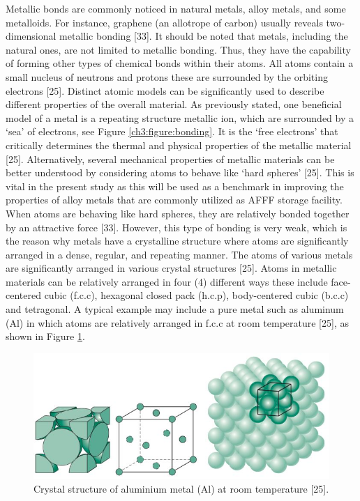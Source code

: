 \documentclass[12pt]{report}
\begin{document}
Metallic bonds are commonly noticed in natural metals, alloy metals, and some metalloids. For instance, graphene (an allotrope of carbon) usually reveals two-dimensional metallic bonding [33]. It should be noted that metals, including the natural ones, are not limited to metallic bonding. Thus, they have the capability of forming other types of chemical bonds within their atoms.
All atoms contain a small nucleus of neutrons and protons these are surrounded by the orbiting electrons [25]. Distinct atomic models can be significantly used to describe different properties of the overall material. As previously stated, one beneficial model of a metal is a repeating structure metallic ion, which are surrounded by a ‘sea’ of electrons, see Figure \ref{ch3:figure:bonding}. It is the ‘free electrons’ that critically determines the thermal and physical properties of the metallic material [25]. Alternatively, several mechanical properties of metallic materials can be better understood by considering atoms to behave like ‘hard spheres’ [25]. This is vital in the present study as this will be used as a benchmark in improving the properties of alloy metals that are commonly utilized as AFFF storage facility.
When atoms are behaving like hard spheres, they are relatively bonded together by an attractive force [33]. However, this type of bonding is very weak, which is the reason why metals have a crystalline structure where atoms are significantly arranged in a dense, regular, and repeating manner. The atoms of various metals are significantly arranged in various crystal structures [25]. Atoms in metallic materials can be relatively arranged in four (4) different ways these include face-centered cubic (f.c.c), hexagonal closed pack (h.c.p), body-centered cubic (b.c.c) and tetragonal. A typical example may include a pure metal such as aluminum (Al) in which atoms are relatively arranged in f.c.c at room temperature [25], as shown in Figure \ref{ch3:figure:aluminium}.
 
\begin{figure}[H]
    \centering
    \includegraphics[width=\textwidth]{aluminium_crystal_structure.jpg}
    \caption{Crystal structure of aluminium metal (Al) at room temperature [25].}
    \label{ch3:figure:aluminium}
\end{figure}
\end{document}
